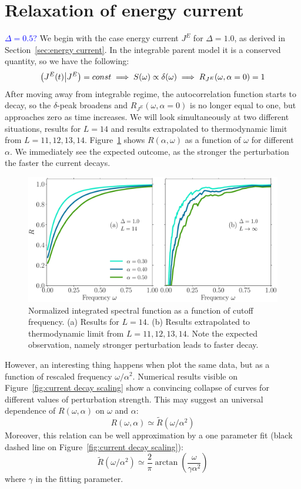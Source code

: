 \section{Relaxation of energy current}
\textcolor{blue}{\(\Delta=0.5\)?}
We begin with the case energy current \(J^E\) for \(\Delta = 1.0\), as derived in Section~\ref{sec:energy current}.
In the integrable parent model it is a conserved quantity, so we have the following:
\begin{equation*}
  \left(J^E(t) \middle| J^E\right) = const \implies S(\omega) \propto \delta(\omega)
  \implies R_{J^E}(\omega,\alpha=0) = 1
\end{equation*}
After moving away from integrable regime, the autocorrelation function starts to decay,
so the \(\delta\)-peak broadens and \(R_{J^E}(\omega,\alpha=0)\) is no longer equal to one,
but approaches zero as time increases. We will look simultaneously at two different situations,
results for \(L=14\) and results extrapolated to thermodynamic limit from \(L=11,12,13,14\). 
Figure~\ref{fig:current decay no scaling} shows \(R(\alpha,\omega)\) as a
function of \(\omega\) for different \(\alpha\). We immediately see the expected outcome, as the stronger
the perturbation the faster the current decays.
\begin{figure}[htbp]
  \centering
  \includegraphics[width=\textwidth]{Figures/current_no_scaling.pdf}
  \caption{Normalized integrated spectral function as a function of cutoff frequency.
  (a) Results for \(L=14\). (b) Results extrapolated to thermodynamic limit from \(L=11,12,13,14\).
  Note the expected observation, namely stronger perturbation leads to faster decay.}
  \label{fig:current decay no scaling}
\end{figure}
However, an interesting thing happens when plot the same data, but as a function of rescaled
frequency \(\omega/\alpha^2\). Numerical results visible on Figure~\ref{fig:current decay scaling}
show a convincing collapse of curves for different values of perturbation strength. This may suggest
an universal dependence of \(R(\omega,\alpha)\) on \(\omega\) and \(\alpha\):
\begin{equation}
  R(\omega,\alpha)\simeq \tilde{R}(\omega/\alpha^2)
\end{equation}
Moreover, this relation can be well approximation by a one parameter fit
(black dashed line on Figure~\ref{fig:current decay scaling}):
\begin{equation*}
  \tilde{R}(\omega/\alpha^2) \simeq \frac{2}{\pi} \arctan\left(\frac{\omega}{\gamma \alpha^2}\right)
\end{equation*}
where \(\gamma\) in the fitting parameter.


